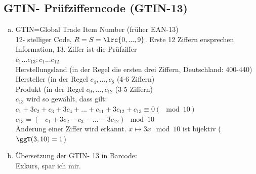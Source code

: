   \subsection{GTIN- Prüfzifferncode (GTIN-13)}
    \begin{enumerate}[a)]
      \item GTIN=Global Trade Item Number (früher EAN-13)\\
        12- stelliger Code, $R=S=\lrc{0,...,9}$. Erste 12 Ziffern ensprechen
        Information, 13. Ziffer ist die Prüfziffer\\
        $c_1...c_{13}:c_1...c_{12}$\\
        Herstellungsland (in der Regel die ersten drei Ziffern, Deutschland:
        400-440)\\
        Hersteller (in der Regel $c_4,...,c_8$ (4-6 Ziffern)\\
        Produkt (in der Regel $c_9,...,c_{12}$ (3-5 Ziffern)\\
        $c_{13}$ wird so gewählt, dass gilt:
        $c_1+3c_2+c_3+3c_4+...+c_{11}+3c_{12}+c_{13}\equiv 0(\mod 10)$\\
        $c_{13}=(-c_1+3c_2-c_3-...-3c_12)\mod 10$\\
        Änderung einer Ziffer wird erkannt. $x\mapsto 3x\mod 10$ ist bijektiv
        ($\ggT(3,10)=1$)
      \item Übersetzung der GTIN- 13 in Barcode:\\
        Exkurs, spar ich mir.
    \end{enumerate}
